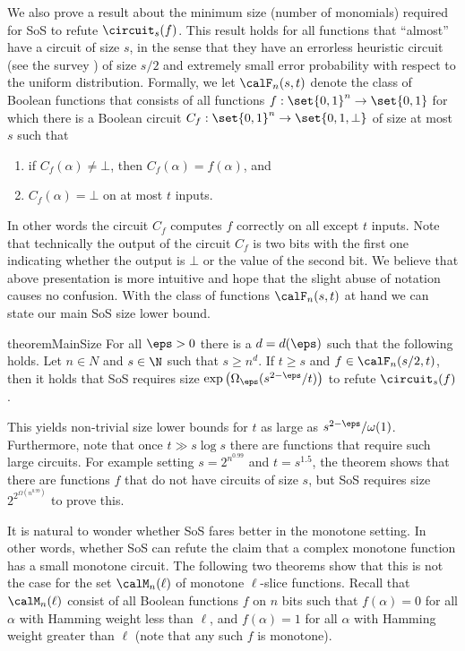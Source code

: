 We also prove a result about the minimum size (number of monomials)
required for SoS to refute $\circuit_s(f)$. This result holds for all
functions that ``almost'' have a circuit of size $s$, in the sense that
they have an errorless heuristic circuit (see the survey \cite{BT06})
of size $s/2$ and extremely small error probability
with respect to the uniform distribution.
% 
Formally, we let $\calF_n(s,t)$ denote the class of Boolean functions
that consists of all functions $f: \set{0,1}^n \rightarrow \set{0,1}$
for which there is a Boolean circuit
$C_f: \set{0,1}^n \rightarrow \set{0, 1, \bot}$ of size at most $s$
such that
\begin{enumerate}
\item if $C_f(\alpha) \neq \bot$, then $C_f(\alpha) = f(\alpha)$, and
\item $C_f(\alpha) = \bot$ on at most $t$ inputs.
\end{enumerate}
In other words the circuit $C_f$ computes $f$ correctly on all except
$t$ inputs. Note that technically the output of the circuit $C_f$ is
two bits with the first one indicating whether the output is $\bot$ or
the value of the second bit.  We believe that above presentation is
more intuitive and hope that the slight abuse of notation causes no
confusion. With the class of functions $\calF_n(s,t)$ at hand we can
state our main SoS size lower bound.


\begin{restatable}{theorem}{MainSize}
  \label{thm:main-size}
  For all $\eps > 0$ there is a $d = d(\eps)$ such that the following
  holds. Let $n \in N$ and $s \in \N$ such that $s \ge n^d$. If
  $t \ge s$ and $f \in \calF_n(s/2, t)$, then it holds that SoS
  requires size $\exp\big(\Omega_\eps(s^{2-\eps}/t)\big)$ to refute
  $\circuit_s(f)$.
\end{restatable}

This yields non-trivial size lower bounds for $t$ as large as
$s^{2-\eps}/\omega(1)$.  Furthermore, note that once $t \gg s \log s$
there are functions that require such large circuits.  For example
setting $s = 2^{n^{0.99}}$ and $t = s^{1.5}$, the theorem shows that
there are functions $f$ that do not have circuits of size $s$, but SoS
requires size $2^{2^{\Omega(n^{0.99})}}$ to prove this.

It is natural to wonder whether SoS fares better in the monotone
setting. In other words, whether SoS can refute the claim that a
complex monotone function has a small monotone circuit. The following
two theorems show that this is not the case for the set
$\calM_n(\ell)$ of monotone $\ell$-slice functions.  Recall that
$\calM_n(\ell)$ consist of all Boolean functions $f$ on $n$ bits such
that $f(\alpha) = 0$ for all $\alpha$ with Hamming weight less than
$\ell$, and $f(\alpha) = 1$ for all $\alpha$ with Hamming weight
greater than $\ell$ (note that any such $f$ is monotone).

